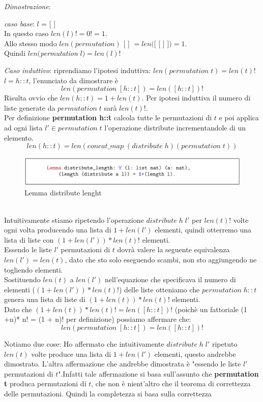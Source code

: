 \documentclass[a4paper]{article}
\newenvironment{dimostrazione}{\textit{Dimostrazione}:\begin{adjustwidth}{1cm}{}}{\end{adjustwidth}}
\begin{document}
\begin{dimostrazione}
	\textit{caso base}: $l$ = [ ]\\
	In questo caso $len(l)! = 0! = 1$.\\
	Allo stesso modo $len(permutation)$ [ ] $= len($[ [ ] ]$) = 1$.\\
	Quindi $len($\textit{permutation} $l) = len(l)!$
	
	\textit{Caso induttivo}: riprendiamo l'ipotesi induttiva: $len(permutation \; t) = len(t)!$
	$l = h::t$, l'enunciato da dimostrare è $$len(permutation \; [h::t]) = len([h::t])!$$
	Risulta ovvio che $len(h::t) = 1 + len(t)$.
	Per ipotesi induttiva il numero di liste generate da $permutation \; t$ sarà $len(t)!$.\\
	Per definizione \textbf{permutation h::t} calcola tutte le permutazioni di $t$ e poi applica ad ogni lista $l' \in permutation \;t$ l'operazione distribute incrementandole di un elemento.
	$$len(h::t) = len(concat\_map \; (distribute \; h) (permutation \; t))$$
\begin{figure}[!ht]
\centering
\includegraphics[width=1\textwidth]{./img/A3_distribute.png}
\caption{Lemma distribute lenght} \label{FIG:A3_distribute}
\end{figure}\\
	Intuitivamente stiamo ripetendo l'operazione $distribute \; h \; l'$ per $len(t) ! $ volte ogni volta producendo una lista di $1 + len(l')$ elementi, quindi otterremo una lista di liste con $(1 + len(l')) * len(t)! $ elementi.\\
	Essendo le liste $l'$ permutazioni di $t$ dovrà valere la seguente equivalenza $len(l') = len(t) $, dato che sto solo eseguendo scambi, non sto aggiungendo ne togliendo elementi.\\
	Sostituendo $len(t)$ a $len(l')$ nell'equazione che specificava il numero di elementi ($(1 + len(l')) * len(t)! $) delle liste otteniamo che $permutation  \; h::t$ genera una lista di liste di $(1+len(t)) * len(t)!$ elementi.\\ %
	Dato che $(1+len(t)) * len(t)! = len([h::t])!$ (poichè un fattoriale (1 +n)* n! = (1 + n)! per definizione) possiamo affermare che: 
	$$len(permutation \; [h::t]) = len([h::t])!$$
\end{dimostrazione}
Notiamo due cose:
Ho affermato che intuitivamente $distribute \; h \; l'$ ripetuto $len(t)$ volte produce una lista di $ 1 + len(l')$ elementi, questo andrebbe dimostrato.
L'altra affermazione che andrebbe dimostrata è "essendo le liste $l'$ permutazioni di $t$".Infatti tale affermazione si basa sull'assunto che \textbf{permutation t} produca permutazioni di $t$, che non è nient'altro che il teorema di correttezza delle permutazioni.
Quindi la completezza si basa sulla correttezza
\end{document}
